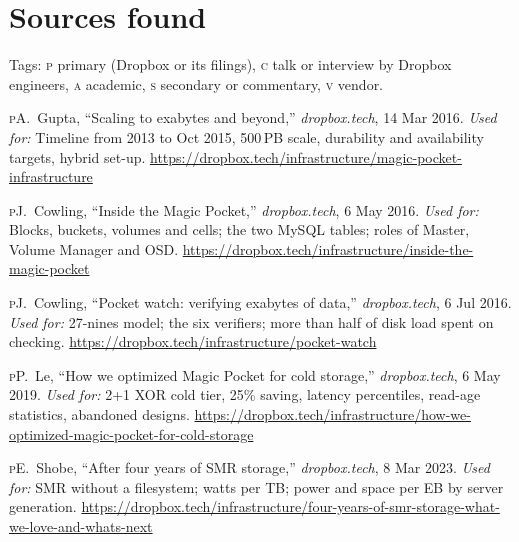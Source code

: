 \documentclass[a4paper,justified,nobib]{tufte-handout}
\begin{document}
\section{Sources found}



\begin{fullwidth}
\footnotesize
\noindent Tags: \textsc{p} primary (Dropbox or its filings), \textsc{c} talk or interview by
Dropbox engineers, \textsc{a} academic, \textsc{s} secondary or commentary, \textsc{v} vendor.

\begin{list}{}{\setlength{\leftmargin}{2.2em}\setlength{\labelwidth}{1.8em}\setlength{\labelsep}{0.4em}\setlength{\itemsep}{1.5pt}\setlength{\parsep}{0pt}}
\item[{[1]}] {\scshape\MakeLowercase{P}}\enspace A.~Gupta, ``Scaling to exabytes and beyond,'' \textit{dropbox.tech}, 14 Mar 2016. \textit{Used for:} Timeline from 2013 to Oct 2015, 500\,PB scale, durability and availability targets, hybrid set-up. \url{https://dropbox.tech/infrastructure/magic-pocket-infrastructure}
\item[{[2]}] {\scshape\MakeLowercase{P}}\enspace J.~Cowling, ``Inside the Magic Pocket,'' \textit{dropbox.tech}, 6 May 2016. \textit{Used for:} Blocks, buckets, volumes and cells; the two MySQL tables; roles of Master, Volume Manager and OSD. \url{https://dropbox.tech/infrastructure/inside-the-magic-pocket}
\item[{[3]}] {\scshape\MakeLowercase{P}}\enspace J.~Cowling, ``Pocket watch: verifying exabytes of data,'' \textit{dropbox.tech}, 6 Jul 2016. \textit{Used for:} 27-nines model; the six verifiers; more than half of disk load spent on checking. \url{https://dropbox.tech/infrastructure/pocket-watch}
\item[{[4]}] {\scshape\MakeLowercase{P}}\enspace P.~Le, ``How we optimized Magic Pocket for cold storage,'' \textit{dropbox.tech}, 6 May 2019. \textit{Used for:} 2+1 XOR cold tier, 25\% saving, latency percentiles, read-age statistics, abandoned designs. \url{https://dropbox.tech/infrastructure/how-we-optimized-magic-pocket-for-cold-storage}
\item[{[5]}] {\scshape\MakeLowercase{P}}\enspace E.~Shobe, ``After four years of SMR storage,'' \textit{dropbox.tech}, 8 Mar 2023. \textit{Used for:} SMR without a filesystem; watts per TB; power and space per EB by server generation. \url{https://dropbox.tech/infrastructure/four-years-of-smr-storage-what-we-love-and-whats-next}

\end{list}
\end{fullwidth}
\end{document}
